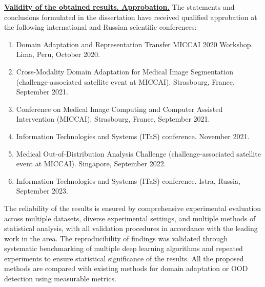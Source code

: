 \begin{enumerate}
 
\end{enumerate}


\underline{\textbf{Validity of the obtained results. Approbation.}} The statements and conclusions formulated in the dissertation have received qualified approbation at the following international and Russian scientific conferences:

\begin{enumerate}
	\item Domain Adaptation and Representation Transfer MICCAI 2020 Workshop. Lima, Peru, October 2020.
    \item Cross-Modality Domain Adaptation for Medical Image Segmentation (challenge-associated satellite event at MICCAI). Strasbourg, France, September 2021.
    \item Conference on Medical Image Computing and Computer Assisted Intervention (MICCAI). Strasbourg, France, September 2021.
    \item Information Technologies and Systems (ITaS) conference. November 2021.
    \item Medical Out-of-Distribution Analysis Challenge (challenge-associated satellite event at MICCAI). Singapore, September 2022.
    \item Information Technologies and Systems (ITaS) conference. Istra, Russia, September 2023.
\end{enumerate}

The reliability of the results is ensured by comprehensive experimental evaluation across multiple datasets, diverse experimental settings, and multiple methods of statistical analysis, with all validation procedures in accordance with the leading work in the area. The reproducibility of findings was validated through systematic benchmarking of multiple deep learning algorithms and repeated experiments to ensure statistical significance of the results. All the proposed methods are compared with existing methods for domain adaptation or OOD detection using measurable metrics.

